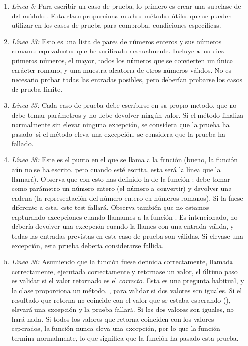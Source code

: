 \begin{enumerate}

\item \emph{Línea 5:} Para escribir un caso de prueba, lo primero es crear una subclase de  del módulo . Esta clase proporciona muchos métodos útiles que se pueden utilizar en los casos de prueba para comprobar condiciones específicas.

\item \emph{Línea 33:} Esto es una lista de pares de números enteros y sus números romanos equivalentes que he verificado manualmente. Incluye a los diez primeros números, el mayor, todos los números que se convierten un único carácter romano, y una muestra aleatoria de otros números válidos. No es necesario probar todas las entradas posibles, pero deberían probarse los casos de prueba límite.

\item \emph{Línea 35:} Cada caso de prueba debe escribirse en su propio método, que no debe tomar parámetros y no debe devolver ningún valor. Si el método finaliza normalmente sin elevar ninguna excepción, se considera que la prueba ha pasado; si el método eleva una excepción, se considera que la prueba ha fallado.

\item \emph{Línea 38:} Este es el punto en el que se llama a la función  (bueno, la función aún no se ha escrito, pero cuando esté escrita, esta será la línea que la llamará). Observa que con esto has definido la  de la función : debe tomar como parámetro un número entero (el número a convertir) y devolver una cadena (la representación del número entero en números romanos). Si la  fuese diferente a esta, este test fallará. Observa también que no estamos capturando excepciones cuando llamamos a la función . Es intencionado,  no debería devolver una excepción cuando la llames con una entrada válida, y todas las entradas previstas en este caso de prueba son válidas. Si  elevase una excepción, esta prueba debería considerarse fallida.

\item \emph{Línea 38:} Asumiendo que la función  fuese definida correctamente, llamada correctamente, ejecutada correctamente y retornase un valor, el último paso es validar si el valor retornado es el \emph{correcto}. Esta es una pregunta habitual, y la clase  proporciona un método, , para validar si dos valores son iguales. Si el resultado que retorna  no coincide con el valor que se estaba esperando (),  elevará una excepción y la prueba fallará. Si los dos valores son iguales,  no hará nada. Si todos los valores que retorna  coinciden con los valores esperados, la función  nunca eleva una excepción, por lo que la función  termina normalmente, lo que significa que la función  ha pasado esta prueba.


\end{enumerate}
